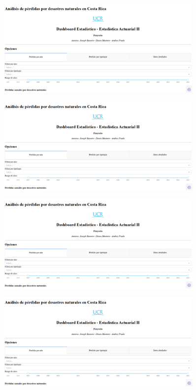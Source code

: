 \documentclass[12pt, a4paper]{article}
\begin{document}
\begin{figure}[htbp]
    \centering
    \includegraphics[width=0.9\textwidth]{fig/avance_dash_1/1.png}
\end{figure}
    \vspace{0.5cm}
\begin{figure}[htbp]
    \centering
    \includegraphics[width=0.9\textwidth]{fig/avance_dash_1/1.png}
\end{figure}
    \vspace{0.5cm}
\begin{figure}[htbp]
    \centering
    \includegraphics[width=0.9\textwidth]{fig/avance_dash_1/1.png}
\end{figure}
    \vspace{0.5cm}
\begin{figure}[htbp]
    \centering
    \includegraphics[width=0.9\textwidth]{fig/avance_dash_1/1.png}
\end{figure}
\end{document}

